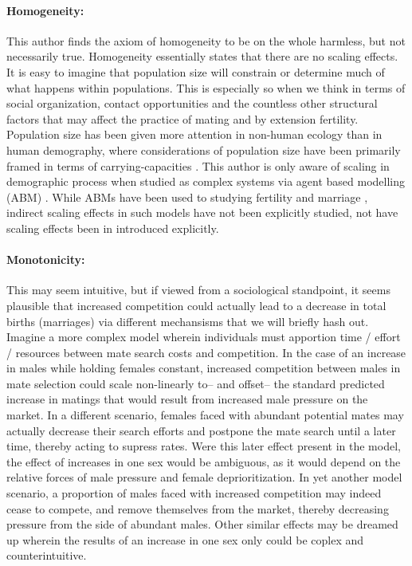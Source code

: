 \paragraph{Homogeneity:} This author finds the axiom of homogeneity to be on the
whole harmless, but not necessarily true. Homogeneity essentially states that
there are no scaling effects. It is easy to imagine that population size will
constrain or determine much of what happens within populations. This is
especially so when we think in terms of social organization, contact
opportunities and the countless other structural factors that may affect the
practice of mating and by extension fertility. Population size has been
given more attention in non-human ecology \citep{donalson1999population} than in
human demography, where considerations of population size have been primarily framed in terms of
carrying-capacities \citep[see e.g.][]{cohen1995human,hopfenberg2003human}. This
author is only aware of scaling in demographic process when studied as complex systems via
agent based modelling (ABM) \citep[e.g.][]{bruch2010scaling}. While ABMs have
been used to studying fertility and marriage \citep{billari2002wedding},
indirect scaling effects in such models have not been explicitly studied, not
have scaling effects been in introduced explicitly.

\paragraph{Monotonicity:} This may seem intuitive, but if viewed from a
sociological standpoint, it seems plausible that increased competition could actually lead to a
decrease in total births (marriages) via different mechansisms that we will
briefly hash out. Imagine a more complex model wherein individuals must
apportion time / effort / resources between mate search costs and competition. 
In the case of an increase in males while holding females
constant, increased competition between males in mate selection could
 scale non-linearly to-- and offset-- the standard predicted increase in matings
 that would result from increased male pressure on the market. In a different
 scenario, females faced with abundant potential mates may actually decrease their 
 search efforts and postpone the mate search until a later time,
 thereby acting to supress rates. Were this later effect present in the model,
 the effect of increases in one sex would be ambiguous, as it would depend on
 the relative forces of male pressure and female deprioritization. In yet
 another model scenario, a proportion of males faced with increased competition may 
 indeed cease to compete, and remove themselves from the market, thereby 
 decreasing pressure from the side of abundant males. Other similar effects may
 be dreamed up wherein the results of an increase in one sex only could be
 coplex and counterintuitive. 
 
